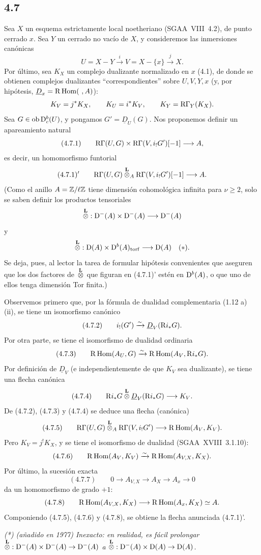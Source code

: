 \subsection*{4.7}
Sea $X$ un esquema estrictamente local noetheriano (SGAA~VIII~4.2), de punto cerrado $x$. Sea $Y$ un cerrado no vacío de $X$, y consideremos las inmersiones canónicas
\[
U=X-Y\xrightarrow{i}V=X-\{x\}\xrightarrow{j}X.
\]
Por último, sea $K_X$ un complejo dualizante normalizado en $x$ (4.1), de donde se obtienen complejos dualizantes \textquotedblleft correspondientes\textquotedblright{} sobre $U,V,Y,x$ (y, por hipótesis, $\underline{D}_x=\R\Hom(\ ,A)$):
\[
K_V=j^*K_X,
\qquad K_U=i^*K_V,
\qquad K_Y=\mathrm{R}\Gamma_Y(K_X).
\]
Sea $G\in\operatorname{ob}\mathrm{D}_c^b(U)$, y pongamos $G'=\underline{D}_U(G)$. Nos proponemos definir un apareamiento natural
\[
(4.7.1)\qquad \mathrm{R}\Gamma(U,G)\times \mathrm{R}\Gamma(V,i_!G')[-1]\longrightarrow A,
\]
es decir, un homomorfismo funtorial
\[
(4.7.1)'\qquad \mathrm{R}\Gamma(U,G)\overset{\mathbf L}{\otimes}_A\mathrm{R}\Gamma(V,i_!G')[-1]\longrightarrow A.
\]
(Como el anillo $A=\mathbb{Z}/\ell\mathbb{Z}$ tiene dimensión cohomológica infinita para $\nu\geqslant2$, solo se saben definir los productos tensoriales
\[
\overset{\mathbf L}{\otimes}:\mathrm{D}^-(A)\times\mathrm{D}^-(A)\longrightarrow\mathrm{D}^-(A)
\]
y
\[
\overset{\mathbf L}{\otimes}:\mathrm{D}(A)\times\mathrm{D}^b(A)_{\mathrm{torf}}\longrightarrow\mathrm{D}(A)\quad(*).
\]
Se deja, pues, al lector la tarea de formular hipótesis convenientes que aseguren que los dos factores de $\overset{\mathbf L}{\otimes}$ que figuran en (4.7.1)' estén en $\mathrm{D}^b(A)$, o que uno de ellos tenga dimensión Tor finita.)

Observemos primero que, por la fórmula de dualidad complementaria (1.12 a) (ii), se tiene un isomorfismo canónico
\[
(4.7.2)\qquad i_!(G')\xrightarrow{\sim}\underline{D}_V(\mathrm{R} i_*G).
\]
Por otra parte, se tiene el isomorfismo de dualidad ordinaria
\[
(4.7.3)\qquad \mathrm{R}\operatorname{Hom}(A_U,G)\xrightarrow{\sim}\mathrm{R}\operatorname{Hom}(A_V,\mathrm{R} i_*G).
\]
Por definición de $\underline{D}_V$ (e independientemente de que $K_V$ sea dualizante), se tiene una flecha canónica
\[
(4.7.4)\qquad \mathrm{R} i_*G\overset{\mathbf L}{\otimes}\underline{D}_V(\mathrm{R} i_*G)\longrightarrow K_V.
\]
De (4.7.2), (4.7.3) y (4.7.4) se deduce una flecha (canónica)
\[
(4.7.5)\qquad \mathrm{R}\Gamma(U,G)\overset{\mathbf L}{\otimes}_A\mathrm{R}\Gamma(V,i_!G')\longrightarrow \mathrm{R}\operatorname{Hom}(A_V,K_V).
\]
Pero $K_V=j^{!}K_X$, y se tiene el isomorfismo de dualidad (SGAA~XVIII~3.1.10):
\[
(4.7.6)\qquad \mathrm{R}\operatorname{Hom}(A_V,K_V)\xrightarrow{\sim}\mathrm{R}\operatorname{Hom}(A_{V,X},K_X).
\]
Por último, la sucesión exacta
\[
(4.7.7)\qquad 0\longrightarrow A_{V,X}\longrightarrow A_X\longrightarrow A_x\longrightarrow 0
\]
da un homomorfismo de grado $+1$:
\[
(4.7.8)\qquad \mathrm{R}\operatorname{Hom}(A_{V,X},K_X)\longrightarrow \mathrm{R}\operatorname{Hom}(A_x,K_X)\simeq A.
\]
Componiendo (4.7.5), (4.7.6) y (4.7.8), se obtiene la flecha anunciada (4.7.1)'.

\emph{(*) (añadido en 1977) Inexacto: en realidad, es fácil prolongar $\overset{\mathbf L}{\otimes}:\mathrm{D}^-(A)\times\mathrm{D}^-(A)\to\mathrm{D}^-(A)$ a $\overset{\mathbf L}{\otimes}:\mathrm{D}^-(A)\times\mathrm{D}(A)\to\mathrm{D}(A)$.}
